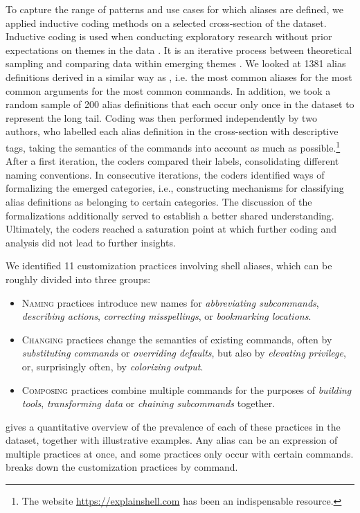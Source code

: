 To capture the range of patterns and use cases for which aliases are defined, we applied inductive coding methods on a selected cross-section of the dataset.
Inductive coding is used when conducting exploratory research without prior expectations on themes in the data \cite{thomas:06}.
It is an iterative process between theoretical sampling and comparing data within emerging themes \cite{dey:03}.
We looked at 1381 alias definitions derived in a similar way as , i.e. the most common aliases for the most common arguments for the most common commands.
In addition, we took a random sample of 200 alias definitions that each occur only once in the dataset to represent the long tail.
Coding was then performed independently by two authors, who labelled each alias definition in the cross-section with descriptive tags, taking the semantics of the commands into account as much as possible.\footnote{The website \url{https://explainshell.com} has been an indispensable resource.}
After a first iteration, the coders compared their labels, consolidating different naming conventions.
In consecutive iterations, the coders identified ways of formalizing the emerged categories, i.e., constructing mechanisms for classifying alias definitions as belonging to certain categories.
The discussion of the formalizations additionally served to establish a better shared understanding.
Ultimately, the coders reached a saturation point at which further coding and analysis did not lead to further insights.

We identified 11 customization practices involving shell aliases, which can be roughly divided into three groups: \TODO
\begin{itemize}
    \item \textsc{Naming} practices introduce new names for \emph{abbreviating subcommands}, \emph{describing actions}, \emph{correcting misspellings}, or \emph{bookmarking locations}.
    \item \textsc{Changing} practices change the semantics of existing commands, often by \emph{substituting commands} or \emph{overriding defaults}, but also by \emph{elevating privilege}, or, surprisingly often, by \emph{colorizing output}.    
    \item \textsc{Composing} practices combine multiple commands for the purposes of \emph{building tools}, \emph{transforming data} or \emph{chaining subcommands} together.
\end{itemize} 

 gives a quantitative overview of the prevalence of each of these practices in the dataset, together with illustrative examples.
Any alias can be an expression of multiple practices at once, and some practices only occur with certain commands.
 breaks down the customization practices by command.

